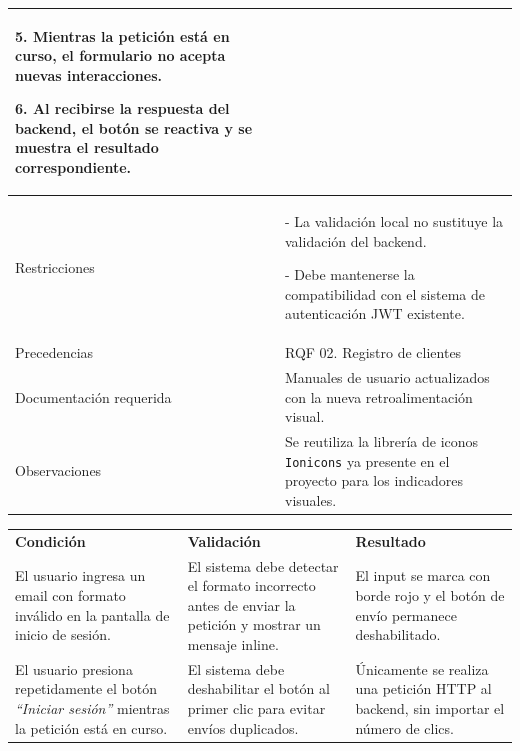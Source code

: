 \begin{tabular}{|p{4.5cm}|p{11cm}|}
5. Mientras la petición está en curso, el formulario no acepta nuevas interacciones. \par
6. Al recibirse la respuesta del backend, el botón se reactiva y se muestra el resultado correspondiente. \\
\hline
Restricciones &
- La validación local no sustituye la validación del backend. \par
- Debe mantenerse la compatibilidad con el sistema de autenticación JWT existente. \\
\hline
Precedencias & RQF 02. Registro de clientes \\
\hline
Documentación requerida & Manuales de usuario actualizados con la nueva retroalimentación visual. \\
\hline
Observaciones &
Se reutiliza la librería de iconos \texttt{Ionicons} ya presente en el proyecto para los indicadores visuales. \\
\hline
\end{tabular}

\vspace{0.3cm}

\noindent
\begin{tabular}{|p{5.1cm}|p{5.1cm}|p{5.1cm}|}
\hline
\rowcolor{secVerde}\multicolumn{3}{|l|}{\color{white}\textbf{4. CONDICIONES DE PRUEBA}} \\
\hline
\rowcolor{cellGris}\textbf{Condición} & \textbf{Validación} & \textbf{Resultado} \\
\hline
El usuario ingresa un email con formato inválido en la pantalla de inicio de sesión. &
El sistema debe detectar el formato incorrecto antes de enviar la petición y mostrar un mensaje inline. &
El input se marca con borde rojo y el botón de envío permanece deshabilitado. \\
\hline
El usuario presiona repetidamente el botón \textit{``Iniciar sesión''} mientras la petición está en curso. &
El sistema debe deshabilitar el botón al primer clic para evitar envíos duplicados. &
Únicamente se realiza una petición HTTP al backend, sin importar el número de clics. \\
\hline
\end{tabular}
